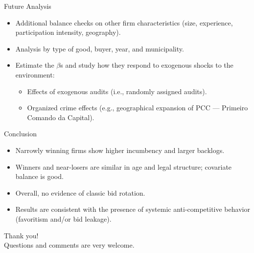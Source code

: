 \documentclass[aspectratio=169]{beamer}
\begin{document}

\begin{frame}{Future Analysis}
\begin{itemize}
  \item Additional balance checks on other firm characteristics (size, experience, participation intensity, geography).
  \item Analysis by type of good, buyer, year, and municipality. \vspace{2mm}
  \item Estimate the $\beta$s and study how they respond to exogenous shocks to the environment:
  \begin{itemize}
    \item Effects of exogenous audits (i.e., randomly assigned audits).
    \item Organized crime effects (e.g., geographical expansion of PCC --- Primeiro Comando da Capital).
  \end{itemize}
\end{itemize}
\end{frame}


\begin{frame}{Conclusion}
  \begin{itemize}
    \item Narrowly winning firms show higher incumbency and larger backlogs.
    \item Winners and near-losers are similar in age and legal structure; covariate balance is good.
    \item Overall, no evidence of classic bid rotation.
    \item Results are consistent with the presence of systemic anti-competitive behavior (favoritism and/or bid leakage).
  \end{itemize}
\end{frame}

\begin{frame}
  \begin{center}
    \Huge Thank you! \\[8pt]
    \large Questions and comments are very welcome.
  \end{center}
\end{frame}
\end{document}
